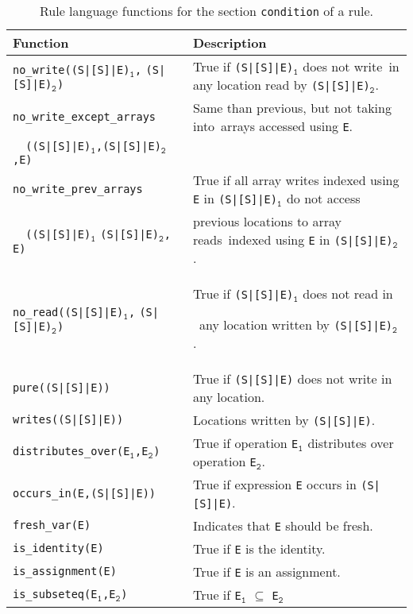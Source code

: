 \documentclass[svgnames,usenames,preprint,nocopyrightspace]{sigplanconf}
\begin{document}
\begin{table*}[t]
  \begin{center}
    \begin{tabular}{|  l  l  |}
      \hline
      \textbf{Function} & \textbf{Description}\\
      \hline
\texttt{no\_write((S|[S]|E)$_\mathtt{1}$,} \texttt{(S|[S]|E)$_\mathtt{2}$)} 
      	&  True if \texttt{(S|[S]|E)$_\mathtt{1}$} does not write~in any location read by \texttt{(S|[S]|E)$_\mathtt{2}$}.\\
      \hline
\texttt{no\_write\_except\_arrays} 
      	&  Same than previous, but not taking into~arrays accessed using \texttt{E}.\\
\texttt{~~((S|[S]|E)$_\mathtt{1}$,(S|[S]|E)$_\mathtt{2}$,}\texttt{E)}        & ~\\
      \hline
\texttt{no\_write\_prev\_arrays} 
      	&  True if all array writes indexed using \texttt{E} in \texttt{(S|[S]|E)$_\mathtt{1}$} do not access\\ 
       \texttt{~~((S|[S]|E)$_\mathtt{1}$} \texttt{(S|[S]|E)$_\mathtt{2}$,} \texttt{E)}&  
previous locations to array reads~indexed using  \texttt{E} in \texttt{(S|[S]|E)$_\mathtt{2}$}.\\
      \hline
\texttt{no\_read((S|[S]|E)$_\mathtt{1}$,} \texttt{(S|[S]|E)$_\mathtt{2}$)} 
      	&  True if \texttt{(S|[S]|E)$_\mathtt{1}$} does not read in

~any location written by \texttt{(S|[S]|E)$_\mathtt{2}$}.\\
      \hline
\texttt{pure((S|[S]|E))} 
      	&  True if \texttt{(S|[S]|E)} does not write
in any location.\\
      \hline
     \texttt{writes((S|[S]|E))} 
      	&  Locations written by \texttt{(S|[S]|E)}.\\ 
      \hline
\texttt{distributes\_over(E$_\mathtt{1}$,E$_\mathtt{2}$)} 
      	&  True if operation \texttt{E$_\mathtt{1}$} distributes over operation \texttt{E$_\mathtt{2}$}.\\ 
      \hline
\texttt{occurs\_in(E,(S|[S]|E))} 
      	&  True if expression \texttt{E} occurs in \texttt{(S|[S]|E)}.\\ 
      \hline
      \texttt{fresh\_var(E)} 
      	&  Indicates that \texttt{E} should be fresh. \\ 
      \hline
      \texttt{is\_identity(E)} 
      	&  True if \texttt{E} is the identity.\\ 
     \hline
      \texttt{is\_assignment(E)} 
      	&  True if \texttt{E} is an assignment.\\ 
      \hline
      \texttt{is\_subseteq(E$_\mathtt{1}$,E$_\mathtt{2}$)} 
      	&  True if \texttt{E$_\mathtt{1}$} $\subseteq$ \texttt{E$_\mathtt{2}$}
	\\ 
      \hline
    \end{tabular}
  \end{center}
  \caption{Rule language functions for the section \texttt{condition}
    of a rule.}
  \label{tab:funscondition}
\end{table*}
\end{document}
